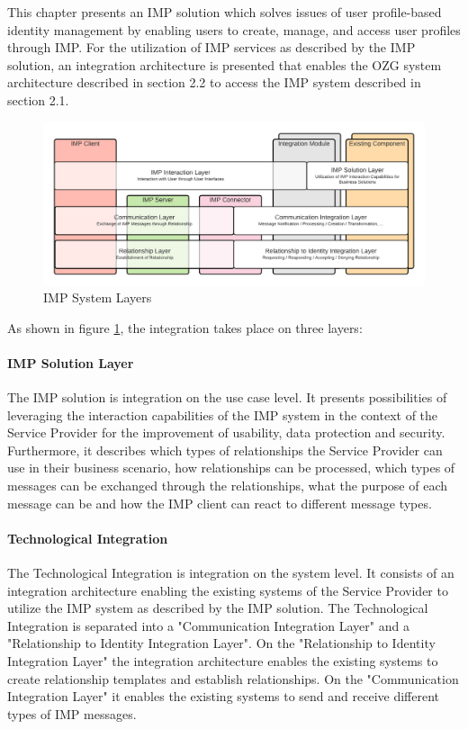 This chapter presents an IMP solution which solves issues of user profile-based identity management by enabling users to create, manage, and access user profiles through IMP. For the utilization of IMP services as described by the IMP solution, an integration architecture is presented that enables the OZG system architecture described in section 2.2 to access the IMP system described in section 2.1.

\begin{figure}[h]
    \centering
    \includegraphics[scale=0.6]{Diagrams/Integration Architecture 1/IMP Layer Diagram Integration.pdf}
    \caption{IMP System Layers}
    \label{integration1:layer_diagram}
\end{figure}

As shown in figure \ref{integration1:layer_diagram}, the integration takes place on three layers:

\paragraph{IMP Solution Layer} 
The IMP solution is integration on the use case level. It presents possibilities of leveraging the interaction capabilities of the IMP system in the context of the Service Provider for the improvement of usability, data protection and security. Furthermore, it describes which types of relationships the Service Provider can use in their business scenario, how relationships can be processed, which types of messages can be exchanged through the relationships, what the purpose of each message can be and how the IMP client can react to different message types.

\paragraph{Technological Integration} 
The Technological Integration is integration on the system level. It consists of an integration architecture enabling the existing systems of the Service Provider to utilize the IMP system as described by the IMP solution. The Technological Integration is separated into a "Communication Integration Layer" and a "Relationship to Identity Integration Layer". On the "Relationship to Identity Integration Layer" the integration architecture enables the existing systems to create relationship templates and establish relationships. On the "Communication Integration Layer" it enables the existing systems to send and receive different types of IMP messages.

